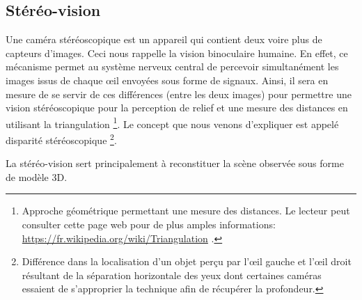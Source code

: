 \documentclass[a4paper, 12pt]{book}
\begin{document}
\subsection{Stéréo-vision}
Une caméra stéréoscopique est un appareil qui contient deux voire plus de capteurs d'images. Ceci nous rappelle la vision binoculaire humaine. En effet, ce mécanisme permet au système nerveux central de percevoir simultanément les images issus de chaque œil envoyées sous forme de signaux. Ainsi, il sera en mesure de se servir de ces différences (entre les deux images)  pour permettre une vision stéréoscopique pour la perception de relief et une mesure des distances en utilisant la triangulation \footnote{Approche géométrique permettant une mesure des distances. Le lecteur peut consulter cette page web pour de plus amples informations: \url{https://fr.wikipedia.org/wiki/Triangulation} .}. Le concept que nous venons d'expliquer est appelé disparité stéréoscopique \footnote{Différence dans la localisation d'un objet perçu par l'œil gauche et l'œil droit résultant de la séparation horizontale des yeux dont certaines caméras essaient de s'approprier la technique afin de récupérer la profondeur.}. 
\par La stéréo-vision sert principalement à reconstituer la scène observée sous forme de modèle 3D. 
\end{document}
